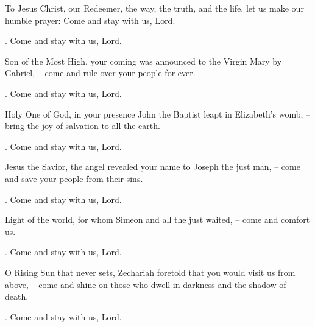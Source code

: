 \lettrine[lines=2]{T}{}o Jesus Christ, our Redeemer, the way, the truth, and the life, let us make our humble prayer: Come and stay with us, Lord.
\par \Rbar. Come and stay with us, Lord.

Son of the Most High, your coming was announced to the Virgin Mary by Gabriel,
– come and rule over your people for ever.
\par \Rbar. Come and stay with us, Lord.

Holy One of God, in your presence John the Baptist leapt in Elizabeth’s womb,
– bring the joy of salvation to all the earth.
\par \Rbar. Come and stay with us, Lord.

Jesus the Savior, the angel revealed your name to Joseph the just man,
– come and save your people from their sins.
\par \Rbar. Come and stay with us, Lord.

Light of the world, for whom Simeon and all the just waited,
– come and comfort us.
\par \Rbar. Come and stay with us, Lord.

O Rising Sun that never sets, Zechariah foretold that you would visit us from above,
– come and shine on those who dwell in darkness and the shadow of death. 
\par \Rbar. Come and stay with us, Lord.